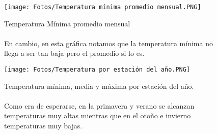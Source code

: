 \documentclass{article}
\begin{document}
\begin{figure}[H]
    \centering
    \texttt{[image: Fotos/Temperatura mínima promedio mensual.PNG]}
    \caption{Temperatura Mínima promedio mensual\\
    \\
    En cambio, en esta gráfica notamos que la temperatura mínima no llega a ser tan baja pero el promedio si lo es.}
\end{figure}

\begin{figure}[H]
    \centering
    \texttt{[image: Fotos/Temperatura por estación del año.PNG]}
    \caption{Temperatura mínima, media y máxima por estación del año.\\
    \\
    Como era de esperarse, en la primavera y verano se alcanzan temperaturas muy altas mientras que en el otoño e invierno temperaturas muy bajas.}
\end{figure}
\end{document}
